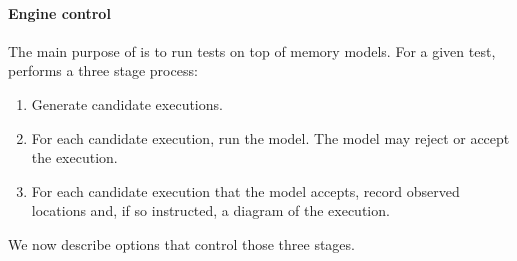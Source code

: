 \paragraph{Engine control}
The main purpose of \herd{} is to run tests on top of memory models.
For a given test, \herd{} performs a three stage process:
\begin{enumerate}
\item Generate candidate executions.
\item For each candidate execution, run the model.
The model may reject or accept the execution.
\item For each candidate execution that the model accepts,
record observed locations and, if so instructed,
a diagram of the execution.
\end{enumerate}
We now describe options that control those three stages.

